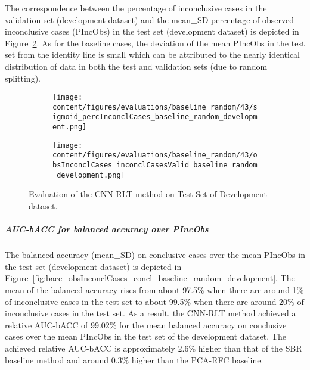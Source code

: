 The correspondence between the percentage of inconclusive cases in the validation set (development dataset) and 
the mean$\pm$SD percentage of observed inconclusive cases (PIncObs) in the test set (development dataset) 
is depicted in Figure~\ref{fig:obsInconclCases_inconclCasesValid_baseline_random_development}.
As for the baseline cases, the deviation of the mean PIncObs in the test set from the 
identity line is small which can be attributed to the nearly identical distribution of data in both the test and validation sets 
(due to random splitting).


\begin{figure}[ht]
  \begin{subfigure}{0.48\textwidth}
    \centering
    \texttt{[image: content/figures/evaluations/baseline\_random/43/sigmoid\_percInconclCases\_baseline\_random\_development.png]}
    \label{fig:baseline_random_percInconclCases_development}
  \end{subfigure}
  \hfill
  \begin{subfigure}{0.495\textwidth}
    \centering
    \texttt{[image: content/figures/evaluations/baseline\_random/43/obsInconclCases\_inconclCasesValid\_baseline\_random\_development.png]}
    \label{fig:obsInconclCases_inconclCasesValid_baseline_random_development}
  \end{subfigure}

  \caption{Evaluation of the CNN-RLT method on Test Set of Development dataset.}
  \label{fig:eval_cnn_rlt_dev}
\end{figure}


\subparagraph{AUC-bACC for balanced accuracy over PIncObs}

The balanced accuracy (mean$\pm$SD) on conclusive cases over the mean PIncObs in the test set (development dataset) 
is depicted in Figure~\ref{fig:bacc_obsInconclCases_concl_baseline_random_development}.
The mean of the balanced accuracy rises from about 97.5\% 
when there are around 1\% of inconclusive cases in the test set to about 99.5\% 
when there are around 20\% of inconclusive cases in the test set.
As a result, the CNN-RLT method achieved a relative AUC-bACC of 99.02\% for the mean balanced accuracy on conclusive cases
over the mean PIncObs in the test set of the development dataset.
The achieved relative AUC-bACC is approximately 2.6\% higher than that of the SBR baseline method 
and around 0.3\% higher than the PCA-RFC baseline.


